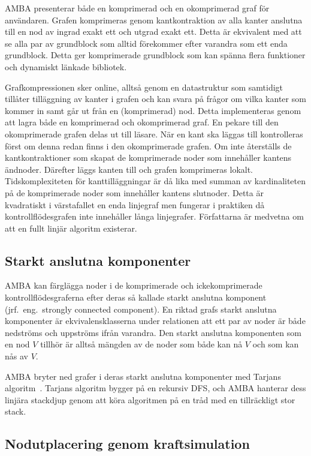 AMBA presenterar både en komprimerad och en okomprimerad graf för användaren.
Grafen komprimeras genom kantkontraktion av alla kanter anslutna till en nod av
ingrad exakt ett och utgrad exakt ett. Detta är ekvivalent med att se alla par
av grundblock som alltid förekommer efter varandra som ett enda grundblock.
Detta ger komprimerade grundblock som kan spänna flera funktioner och dynamiskt
länkade bibliotek.

Grafkompressionen sker online, alltså genom en datastruktur som samtidigt
tillåter tilläggning av kanter i grafen och kan svara på frågor om vilka kanter
som kommer in samt går ut från en (komprimerad) nod. Detta implementeras genom
att lagra både en komprimerad och okomprimerad graf. En pekare till den
okomprimerade grafen delas ut till läsare. När en kant ska läggas till
kontrolleras först om denna redan finns i den okomprimerade grafen. Om inte
återställs de kantkontraktioner som skapat de komprimerade noder som innehåller
kantens ändnoder. Därefter läggs kanten till och grafen komprimeras lokalt.
Tidskomplexiteten för kanttilläggningar är då lika med summan av kardinaliteten
på de komprimerade noder som innehåller kantens slutnoder. Detta är kvadratiskt
i värstafallet en enda linjegraf men fungerar i praktiken då
kontrollflödesgrafen inte innehåller långa linjegrafer. Författarna är medvetna
om att en fullt linjär algoritm existerar.

\subsection{Starkt anslutna komponenter}

AMBA kan färglägga noder i de komprimerade och ickekomprimerade
kontrollflödesgraferna efter deras så kallade starkt anslutna komponent (jrf.\
eng.\ strongly connected component). En riktad grafs starkt anslutna komponenter
är ekvivalensklasserna under relationen att ett par av noder är både nedströms
och uppströms ifrån varandra. Den starkt anslutna komponenten som en nod $V$
tillhör är alltså mängden av de noder som både kan nå $V$ och som kan nås av
$V$.

AMBA bryter ned grafer i deras starkt anslutna komponenter med Tarjans
algoritm~\cite{tarjan}. Tarjans algoritm bygger på en rekursiv DFS, och AMBA
hanterar dess linjära stackdjup genom att köra algoritmen på en tråd med en
tillräckligt stor stack.

\subsection{Nodutplacering genom kraftsimulation}

